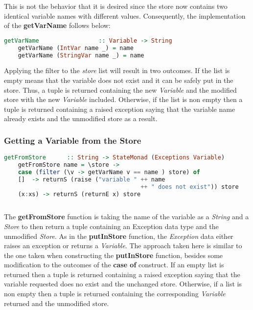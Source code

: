 \documentclass[a4paper, onecolumn]{article}
\begin{document}
    \noindent This is not the behavior that it is desired since the store now contains two identical variable names with different values. Consequently, the implementation of the \textbf{getVarName} follows below: 
    
    \begin{tcolorbox}
    \begin{lstlisting}[language=Haskell] 
    getVarName                 :: Variable -> String
    getVarName (IntVar name _) = name
    getVarName (StringVar name _) = name
    \end{lstlisting}
    \end{tcolorbox}
    
    \noindent Applying the filter to the \textit{store} list will result in two outcomes. If the list is empty means that the variable does not exist and it can be safely put in the store. Thus, a tuple is returned containing the new \textit{Variable} and the modified store with the new \textit{Variable} included. Otherwise, if the list is non empty then a tuple is returned containing a raised exception saying that the variable name already exists and the unmodified store as a result.
    
    \subsubsection{Getting a Variable from the Store}
    
    \begin{tcolorbox}
    \begin{lstlisting}[language=Haskell] 
    getFromStore      :: String -> StateMonad (Exceptions Variable)
    getFromStore name = \store -> 
    case (filter (\v -> getVarName v == name ) store) of 
    []  -> returnS (raise ("variable " ++ name 
                                       ++ " does not exist")) store 
    (x:xs) -> returnS (returnE x) store 
    
    \end{lstlisting}
    \end{tcolorbox}
    
    \noindent The \textbf{getFromStore} function is taking the name of the variable as a \textit{String} and a \textit{Store} to then return a tuple containing an Exception data type and the unmodified \textit{Store}. As in the \textbf{putInStore} function, the \textit{Exception} data either raises an exception or returns a \textit{Variable}. The approach taken here is similar to the one taken when constructing the \textbf{putInStore} function, besides some modification to the outcomes of the \textbf{case of} construct. If an empty list is returned then a tuple is returned containing a raised exception saying that the variable requested does no exist and the unchanged store. Otherwise, if a list is non empty then a tuple is returned containing the corresponding \textit{Variable} returned and the unmodified store. 
    
\end{document}
